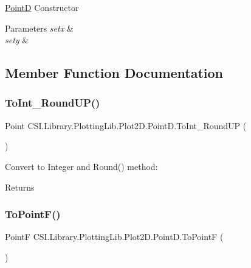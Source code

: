 \mbox{\hyperlink{struct_c_s_i_1_1_library_1_1_plotting_lib_1_1_plot2_d_1_1_point_d}{PointD}} Constructor 


\begin{DoxyParams}{Parameters}
{\em setx} & \\
\hline
{\em sety} & \\
\hline
\end{DoxyParams}


\subsection{Member Function Documentation}
\mbox{\label{struct_c_s_i_1_1_library_1_1_plotting_lib_1_1_plot2_d_1_1_point_d_a1468162247f03b100093a43bc5581333}} 
\subsubsection{\texorpdfstring{ToInt\_RoundUP()}{ToInt\_RoundUP()}}
{\footnotesize\ttfamily Point C\+S\+I.\+Library.\+Plotting\+Lib.\+Plot2\+D.\+Point\+D.\+To\+Int\+\_\+\+Round\+UP (\begin{DoxyParamCaption}{ }\end{DoxyParamCaption})\hspace{0.3cm}{\ttfamily [inline]}}



Convert to Integer and Round() method\+: 

\begin{DoxyReturn}{Returns}

\end{DoxyReturn}
\mbox{\label{struct_c_s_i_1_1_library_1_1_plotting_lib_1_1_plot2_d_1_1_point_d_af2c7629547d17ef06b48580773efc681}} 
\subsubsection{\texorpdfstring{ToPointF()}{ToPointF()}}
{\footnotesize\ttfamily PointF C\+S\+I.\+Library.\+Plotting\+Lib.\+Plot2\+D.\+Point\+D.\+To\+PointF (\begin{DoxyParamCaption}{ }\end{DoxyParamCaption})\hspace{0.3cm}{\ttfamily [inline]}}



